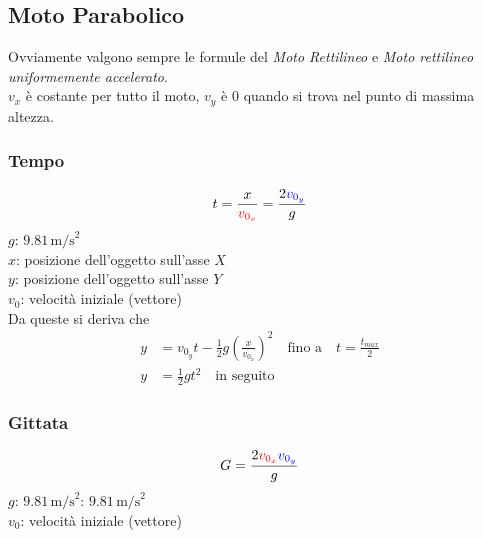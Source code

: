 \subsection{Moto Parabolico}\label{subsec:cinematica:mp}
\begin{center}
\end{center}
Ovviamente valgono sempre le formule del \textit{Moto Rettilineo} e \textit{Moto rettilineo 
uniformemente accelerato}.\\
$v_{x}$ è costante per tutto il moto, $v_{y}$ è $0$ quando si trova nel punto di massima altezza.

\subsubsection{Tempo}
\begin{equation*}
t = \frac{x}{\mathcolor{red}{v_{0_x}}} =
\frac{2\mathcolor{blue}{v_{0_y}}}{g}
\end{equation*}
\hyperref[tab:g]{$g$}: $9.81\,\text{m/s}^2$\\
$x$: posizione dell'oggetto sull'asse $X$\\
$y$: posizione dell'oggetto sull'asse $Y$\\
$v_0$: velocità iniziale (vettore)\\[\baselineskip]
Da queste si deriva che
\begin{align*}
  y&=v_{0_y}t-\frac{1}{2}g\left(\frac{x}{v_{0_x}}\right)^2\quad
  \text{fino a}\quad t=\frac{t_{max}}{2}\\
  y&=\frac{1}{2}gt^2\quad\text{in seguito}
\end{align*}
\subsubsection{Gittata}
\begin{equation*}
G = \frac{2\mathcolor{red}{v_{0_x}}\mathcolor{blue}{v_{0_y}}}{g}
\end{equation*}
\hyperref[tab:g]{$g$}: $9.81\,\text{m/s}^2$: $9.81\,\text{m/s}^2$\\
$v_0$: velocità iniziale (vettore)

